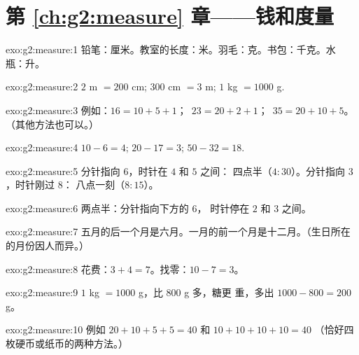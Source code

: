 \section*{第 \ref{ch:g2:measure} 章——钱和度量}

\begin{solution}{exo:g2:measure:1}
铅笔：厘米。教室的长度：米。羽毛：克。书包：千克。水
瓶：升。
\end{solution}

\begin{solution}{exo:g2:measure:2}
$2$ m $= 200$ cm; \quad $300$ cm $= 3$ m; \quad $1$ kg $= 1000$ g.
\end{solution}

\begin{solution}{exo:g2:measure:3}
例如：$16 = 10 + 5 + 1$；\ $23 = 20 + 2 + 1$；\
$35 = 20 + 10 + 5$。（其他方法也可以。）
\end{solution}

\begin{solution}{exo:g2:measure:4}
$10 - 6 = 4$; \quad $20 - 17 = 3$; \quad $50 - 32 = 18$.
\end{solution}

\begin{solution}{exo:g2:measure:5}
分针指向 $6$，时针在 $4$ 和 $5$ 之间：
四点半（$4{:}30$）。分针指向 $3$，时针刚过 $8$：
八点一刻（$8{:}15$）。
\end{solution}

\begin{solution}{exo:g2:measure:6}
两点半：分针指向下方的 $6$，
时针停在 $2$ 和 $3$ 之间。
\end{solution}

\begin{solution}{exo:g2:measure:7}
五月的后一个月是六月。一月的前一个月是十二月。（生日所在的月份因人而异。）
\end{solution}

\begin{solution}{exo:g2:measure:8}
花费：$3 + 4 = 7$。找零：$10 - 7 = 3$。
\end{solution}

\begin{solution}{exo:g2:measure:9}
$1$ kg $= 1000$ g，比 $800$ g 多，糖更
重，多出 $1000 - 800 = 200$ g。
\end{solution}

\begin{solution}{exo:g2:measure:10}
例如 $20 + 10 + 5 + 5 = 40$ 和 $10 + 10 + 10 + 10 = 40$
（恰好四枚硬币或纸币的两种方法。）
\end{solution}
